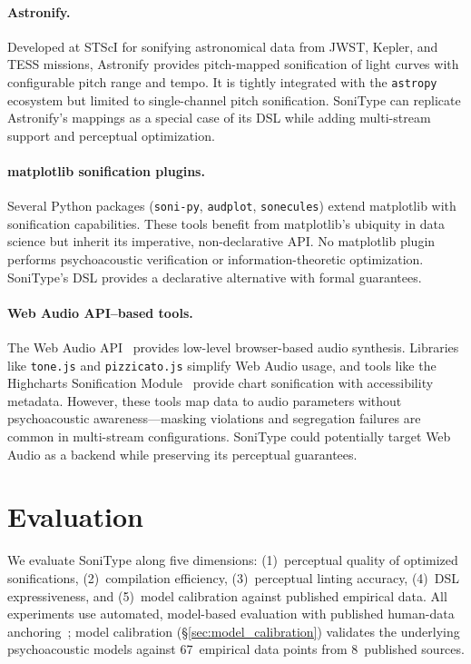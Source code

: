 \documentclass[sigchi, nonacm]{acmart}
\begin{document}
\paragraph{Astronify.} Developed at STScI for sonifying astronomical data from JWST, Kepler, and TESS missions, Astronify provides pitch-mapped sonification of light curves with configurable pitch range and tempo. It is tightly integrated with the \texttt{astropy} ecosystem but limited to single-channel pitch sonification. SoniType can replicate Astronify's mappings as a special case of its DSL while adding multi-stream support and perceptual optimization.

\paragraph{matplotlib sonification plugins.} Several Python packages (\texttt{soni-py}, \texttt{audplot}, \texttt{sonecules}) extend matplotlib with sonification capabilities. These tools benefit from matplotlib's ubiquity in data science but inherit its imperative, non-declarative API. No matplotlib plugin performs psychoacoustic verification or information-theoretic optimization. SoniType's DSL provides a declarative alternative with formal guarantees.

\paragraph{Web Audio API--based tools.} The Web Audio API~\cite{webaudioapi} provides low-level browser-based audio synthesis. Libraries like \texttt{tone.js} and \texttt{pizzicato.js} simplify Web Audio usage, and tools like the Highcharts Sonification Module~\cite{highcharts2022} provide chart sonification with accessibility metadata. However, these tools map data to audio parameters without psychoacoustic awareness---masking violations and segregation failures are common in multi-stream configurations. SoniType could potentially target Web Audio as a backend while preserving its perceptual guarantees.

\section{Evaluation}
\label{sec:eval}

We evaluate SoniType along five dimensions: (1)~perceptual quality of optimized sonifications, (2)~compilation efficiency, (3)~perceptual linting accuracy, (4)~DSL expressiveness, and (5)~model calibration against published empirical data. All experiments use automated, model-based evaluation with published human-data anchoring~\cite{moore2012introduction}; model calibration (\S\ref{sec:model_calibration}) validates the underlying psychoacoustic models against 67~empirical data points from 8~published sources.
\end{document}
